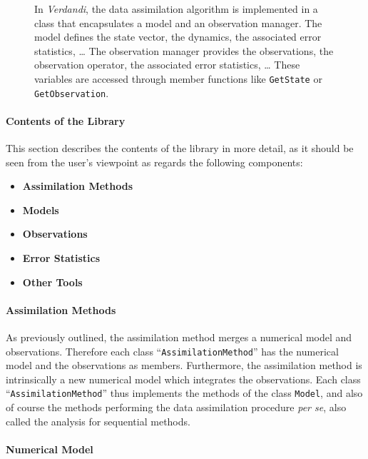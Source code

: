 \documentclass{tufte-book}
\newcommand{\code}[1]{\texttt{#1}}
\begin{document}
\begin{figure}[htbp]
\begin{tikzpicture}[every node/.style = {anchor = base},scale=0.75]
   \end{tikzpicture}

  \caption{In \emph{Verdandi}, the data assimilation algorithm is implemented in a class that encapsulates a model and an observation manager. The model defines the state vector, the dynamics, the associated error statistics, \ldots{} The observation manager provides the observations, the observation operator, the associated error statistics, \ldots{} These variables are accessed through member functions like \texttt{GetState} or \texttt{GetObservation}.}
  \label{fig:verdandi_class}
\end{figure}



\paragraph{Contents of the Library}

This section describes the contents of the library in more detail, as it should be seen from
the user's viewpoint as regards the following components:
\begin{itemize}
	\item \textbf{Assimilation Methods}
	\item \textbf{Models}
	\item \textbf{Observations}
	\item \textbf{Error Statistics}
	\item \textbf{Other Tools}
\end{itemize}

\paragraph{Assimilation Methods}

As previously outlined, the assimilation method merges a numerical model and  observations.
Therefore each class ``\code{AssimilationMethod}'' has the numerical model and the observations as members. Furthermore,
the assimilation method is intrinsically a new numerical model which integrates the observations. Each
class ``\code{AssimilationMethod}'' thus implements the methods of the class \code{Model}, and also of course the methods performing the data assimilation procedure \emph{per se}, also called the analysis for sequential methods.

\paragraph{Numerical Model}
\end{document}
